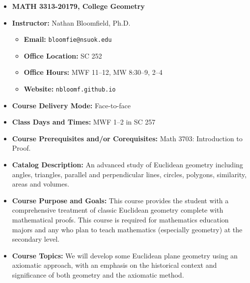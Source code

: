 \documentclass{article}
\begin{document}
\begin{itemize}
\item[] \textbf{\Large MATH 3313-20179, College Geometry}

\item \textbf{Instructor:} Nathan Bloomfield, Ph.D.
\begin{itemize}
\item[] \textbf{Email:} \texttt{bloomfie@nsuok.edu}
\item[] \textbf{Office Location:} SC 252 
\item[] \textbf{Office Hours:} MWF 11--12, MW 8:30--9, 2--4
\item[] \textbf{Website:} \texttt{nbloomf.github.io}
\end{itemize}


\item \textbf{Course Delivery Mode:} Face-to-face


\item \textbf{Class Days and Times:} MWF 1--2 in SC 257


\item \textbf{Course Prerequisites and/or Corequisites:} Math 3703: Introduction to Proof.


\item \textbf{Catalog Description:} An advanced study of Euclidean geometry including angles, triangles, parallel and perpendicular lines, circles, polygons, similarity, areas and volumes.


\item \textbf{Course Purpose and Goals:} This course provides the student with a comprehensive treatment of classic Euclidean geometry complete with mathematical proofs.  This course is required for mathematics education majors and any who plan to teach mathematics (especially geometry) at the secondary level.


\item \textbf{Course Topics:} We will develop some Euclidean plane geometry using an axiomatic approach, with an emphasis on the historical context and significance of both geometry and the axiomatic method.



\end{itemize}
\end{document}
